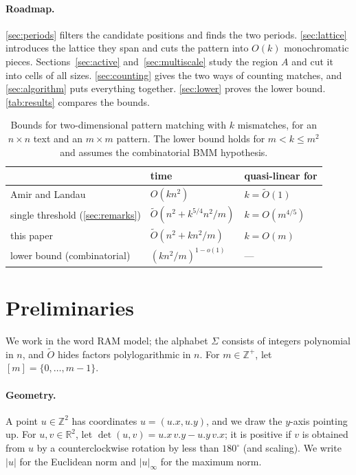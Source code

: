 \documentclass[11pt]{article}
\theoremstyle{definition}
\newcommand{\Z}{\mathbb{Z}}
\newcommand{\R}{\mathbb{R}}
\newcommand{\tO}{\tilde{O}}
\renewcommand{\O}{O}
\newcommand{\abs}[1]{\lvert #1 \rvert}
\newcommand{\inorm}[1]{\lvert #1 \rvert_\infty}
\newcommand{\x}[1]{#1.x}
\newcommand{\y}[1]{#1.y}
\begin{document}
\paragraph{Roadmap.}
\autoref{sec:periods} filters the candidate positions and finds the two periods.
\autoref{sec:lattice} introduces the lattice they span and cuts the pattern into $\O(k)$ monochromatic pieces.
Sections~\ref{sec:active} and~\ref{sec:multiscale} study the region $A$ and cut it into cells of all sizes.
\autoref{sec:counting} gives the two ways of counting matches, and \autoref{sec:algorithm} puts everything together.
\autoref{sec:lower} proves the lower bound.
\autoref{tab:results} compares the bounds.

\begin{table}[ht]
  \centering
  \renewcommand{\arraystretch}{1.3}
  \begin{tabular}{@{}lll@{}}
    \toprule
    & time & quasi-linear for \\
    \midrule
    Amir and Landau & $\O(kn^2)$ & $k = \tO(1)$ \\
    single threshold (\autoref{sec:remarks}) & $\tO(n^2 + k^{5/4} n^2/m)$ & $k = \O(m^{4/5})$ \\
    this paper & $\tO(n^2 + kn^2/m)$ & $k = \O(m)$ \\
    lower bound (combinatorial) & $(kn^2/m)^{1-o(1)}$ & --- \\
    \bottomrule
  \end{tabular}
  \caption{Bounds for two-dimensional pattern matching with $k$ mismatches, for an $n \times n$ text and an $m \times m$ pattern.
    The lower bound holds for $m < k \le m^2$ and assumes the combinatorial BMM hypothesis.}
  \label{tab:results}
\end{table}

\section{Preliminaries}

We work in the word RAM model; the alphabet $\Sigma$ consists of integers polynomial in $n$, and $\tO$ hides factors polylogarithmic in $n$.
For $m \in \Z^+$, let $[m] = \{0, \dots, m-1\}$.

\paragraph{Geometry.}
A point $u \in \Z^2$ has coordinates $u = (\x u, \y u)$, and we draw the $y$-axis pointing up.
For $u, v \in \R^2$, let $\det(u,v) = \x{u}\,\y{v} - \y{u}\,\x{v}$; it is positive if $v$ is obtained from $u$ by a counterclockwise rotation by less than $180^\circ$ (and scaling).
We write $\abs{u}$ for the Euclidean norm and $\inorm{u}$ for the maximum norm.
\end{document}
